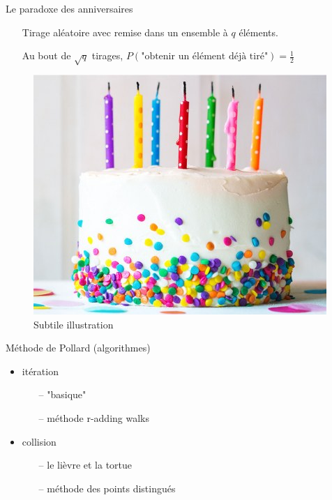 \documentclass{beamer}
\begin{document}
  \begin{frame}{Le paradoxe des anniversaires}
    \begin{itemize}
      \item[] Tirage aléatoire avec remise dans un ensemble à $q$ éléments.
      \item[] Au bout de $\sqrt{q}$ tirages, $P(\text{"obtenir un élément déjà tiré"}) = \frac{1}{2}$
    \end{itemize}

    \begin{figure}
      \center{}
      \includegraphics[scale=0.4]{images/birthday_cake.jpg}
      \caption{Subtile illustration}
    \end{figure}
  \end{frame}


  \begin{frame}{Méthode de Pollard (algorithmes)}
    \begin{itemize}
      \item itération
        \begin{itemize}
          \item[--] "basique"
          \item[--] méthode r-adding walks
        \end{itemize}
      \item collision
        \begin{itemize}
          \item[--] le lièvre et la tortue
          \item[--] méthode des points distingués
        \end{itemize}
    \end{itemize}
  \end{frame}
\end{document}
